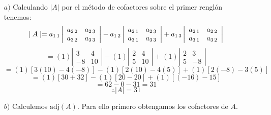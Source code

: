 \begin{enumerate}
\item[$a)$] Calculando $|A|$ por el m\'etodo de cofactores sobre el primer rengl\'on tenemos:
\[ \mid A\mid = a_{1\hspace{0.5mm}1}\left| \begin{array}{cc}	
a_{2\hspace{0.5mm}2} & a_{2\hspace{0.5mm}3}\\
a_{3\hspace{0.5mm}2} & a_{3\hspace{0.5mm}3}
\end{array} \right|- a_{1\hspace{0.5mm}2}\left| \begin{array}{cc}	
a_{2\hspace{0.5mm}1} & a_{2\hspace{0.5mm}3}\\
a_{3\hspace{0.5mm}1} & a_{3\hspace{0.5mm}3}
\end{array} \right| + a_{1\hspace{0.5mm}3}\left| \begin{array}{cc}	
a_{2\hspace{0.5mm}1} & a_{2\hspace{0.5mm}2}\\
a_{3\hspace{0.5mm}1} & a_{3\hspace{0.5mm}2}
\end{array} \right| \]
\[= 
(1)\left| \begin{array}{cc}	
3 & 4\\
-8 & 10
\end{array} \right| - (1)\left| \begin{array}{cc}	
2 & 4\\
5 & 10
\end{array} \right| + (1)\left| \begin{array}{cc}	
2 & 3\\
5 & -8
\end{array} \right| \]
\[= (1)[3(10)- 4(-8)]-(1)[2(10)-4(5)]+(1)[2(-8)- 3(5)] \]
\[= (1)[30 + 32] - (1)[20 - 20]+ (1)[(-16)-15] \]
\[= 62 - 0 - 31 = 31 \]
\[\therefore \mid A\mid = 31\]
\item[$b)$] Calculemos $\text{adj}(A)$. Para ello primero obtengamos los cofactores de $A$.
\end{enumerate}
